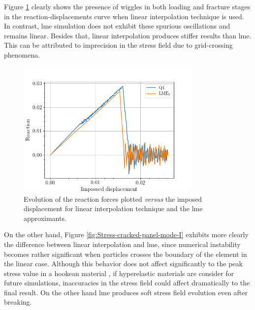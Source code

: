 \message{ !name(2020_EFM_MPM_Eigensoftening.tex)}\documentclass[preprint,12pt,a4paper]{elsarticle}
\begin{document}
Figure \ref{fig:Reactions-cracked-panel-mode-I} clearly shows the
presence of wiggles in both loading and fracture stages
in the reaction-displacements curve when linear interpolation
technique is used. In contrast, \acrshort{lme} simulation does not
exhibit these spurious oscillations and remains linear. Besides that,
linear interpolation produces stiffer results than
\acrshort{lme}. This can be attributed to imprecision in the stress
field due to grid-crossing phenomena.\\
\begin{figure}
  \centering
  \includegraphics[width=0.8\textwidth]{Figure-Reactions-Mode-I}
  \caption{Evolution of the reaction forces plotted \textit{versus}
    the imposed displacement for linear interpolation technique and
    the \acrshort{lme} approximants.}
  \label{fig:Reactions-cracked-panel-mode-I}
\end{figure}
On the other hand, Figure \ref{fig:Stress-cracked-panel-mode-I}
exhibits more clearly the difference between linear interpolation and
\acrshort{lme}, since numerical instability becomes rather significant
when particles crosses the boundary of the element in the linear
case. Although this behavior does not affect significantly to the peak
stress value in a hookean material \cite{Zhang_EE_2020}, if
hyperelastic materials are consider for future simulations,
inaccuracies in the stress field could affect dramatically to the
final result. On the other hand \acrshort{lme} produces soft stress
field evolution even after breaking.
\end{document}
